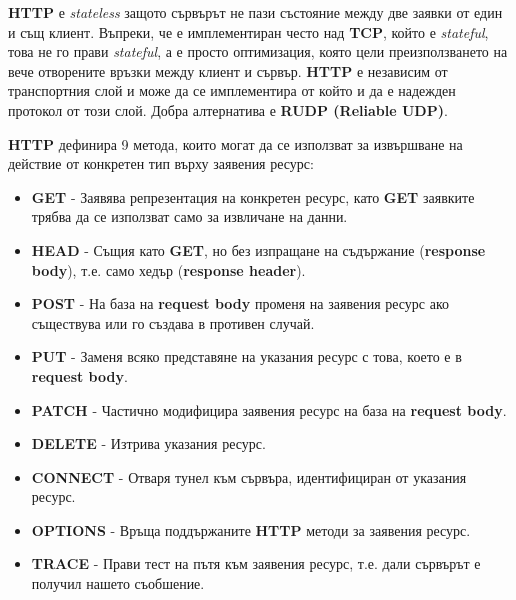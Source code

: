\documentclass[fleqn,12pt]{article}
\begin{document}
\textbf{HTTP} е \textit{stateless} защото сървърът не пази състояние между две заявки от един и същ клиент.
Въпреки, че е имплементиран често над \textbf{TCP}, който е \textit{stateful}, това не го прави \textit{stateful}, а е просто оптимизация, която цели преизползването на вече отворените връзки между клиент и сървър.
\textbf{HTTP} е независим от транспортния слой и може да се имплементира от който и да е надежден протокол от този слой.
Добра алтернатива е \textbf{RUDP (Reliable UDP)}.

\textbf{HTTP} дефинира 9 метода, които могат да се използват за извършване на действие от конкретен тип върху заявения ресурс:
\begin{itemize}
    \item \textbf{GET} - Заявява репрезентация на конкретен ресурс, като \textbf{GET} заявките трябва да се използват само за извличане на данни.
    \item \textbf{HEAD} - Същия като \textbf{GET}, но без изпращане на съдържание (\textbf{response body}), т.е. само хедър (\textbf{response header}).
    \item \textbf{POST} - На база на \textbf{request body} променя на заявения ресурс ако съществува или го създава в противен случай.
    \item \textbf{PUT} - Заменя всяко представяне на указания ресурс с това, което е в \textbf{request body}.
    \item \textbf{PATCH} - Частично модифицира заявения ресурс на база на \textbf{request body}.
    \item \textbf{DELETE} - Изтрива указания ресурс.
    \item \textbf{CONNECT} - Отваря тунел към сървъра, идентифициран от указания ресурс.
    \item \textbf{OPTIONS} - Връща поддържаните \textbf{HTTP} методи за заявения ресурс.
    \item \textbf{TRACE} - Прави тест на пътя към заявения ресурс, т.е. дали сървърът е получил нашето съобшение.
\end{itemize}
\end{document}
